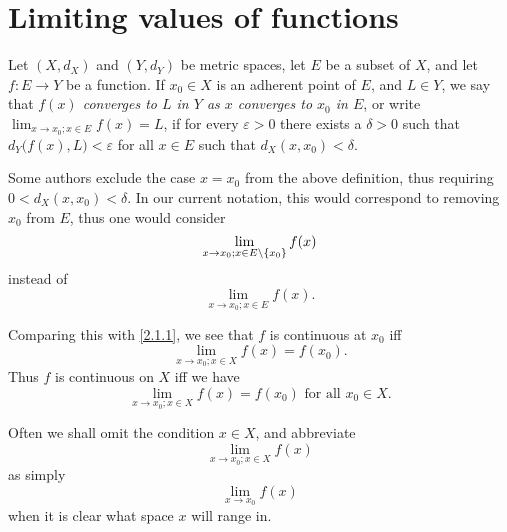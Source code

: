 \section{Limiting values of functions}\label{sec:3.1}

\begin{defn}\label{3.1.1}
  Let \((X, d_X)\) and \((Y, d_Y)\) be metric spaces, let \(E\) be a subset of \(X\), and let \(f : E \to Y\) be a function.
  If \(x_0 \in X\) is an adherent point of \(E\), and \(L \in Y\), we say that \emph{\(f(x)\) converges to \(L\) in \(Y\) as \(x\) converges to \(x_0\) in \(E\)}, or write \(\lim_{x \to x_0 ; x \in E} f(x) = L\), if for every \(\varepsilon > 0\) there exists a \(\delta > 0\) such that \(d_Y\big(f(x), L\big) < \varepsilon\) for all \(x \in E\) such that \(d_X(x, x_0) < \delta\).
\end{defn}

\begin{rmk}\label{3.1.2}
  Some authors exclude the case \(x = x_0\) from the above definition, thus requiring \(0 < d_X(x, x_0) < \delta\).
  In our current notation, this would correspond to removing \(x_0\) from \(E\), thus one would consider
  \[
    \lim_{x \to x_0 ; x \in E \setminus \left\lbrace x_0\right\rbrace} f(x)
  \]
  instead of
  \[
    \lim_{x \to x_0 ; x \in E} f(x).
  \]
\end{rmk}

\begin{note}
  Comparing this with \cref{2.1.1}, we see that \(f\) is continuous at \(x_0\) iff
  \[
    \lim_{x \to x_0 ; x \in X} f(x) = f(x_0).
  \]
  Thus \(f\) is continuous on \(X\) iff we have
  \[
    \lim_{x \to x_0 ; x \in X} f(x) = f(x_0) \text{ for all } x_0 \in X.
  \]
\end{note}

\setcounter{thm}{3}
\begin{rmk}\label{3.1.4}
  Often we shall omit the condition \(x \in X\), and abbreviate
  \[
    \lim_{x \to x_0 ; x \in X} f(x)
  \]
  as simply
  \[
    \lim_{x \to x_0} f(x)
  \]
  when it is clear what space \(x\) will range in.
\end{rmk}

